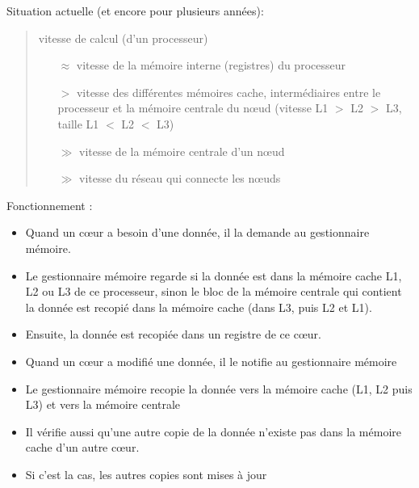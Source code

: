 \documentclass{beamer}
\begin{document}
\begin{frame}[fragile]
Situation actuelle (et encore pour plusieurs ann\'ees): 
\begin{quote}
	
	\vfill
	vitesse de calcul (d'un processeur)
	\vfill
	
	\begin{itemize}
		\item[$\approx$] vitesse de la m\'emoire interne (registres) du processeur
			\medskip
	        
		\item[$>$] vitesse des diff\'erentes m\'emoires cache, interm\'ediaires entre le processeur et la m\'emoire centrale du n\oe ud (vitesse L1 $>$ L2 $>$ L3, taille L1 $<$ L2 $<$ L3)
			\medskip
			
		\item[$\gg$] vitesse de la m\'emoire centrale d'un n\oe ud
			\medskip
			
		\item[$\gg$] vitesse du r\'eseau qui connecte les n\oe uds
	\end{itemize}


\end{quote}

\end{frame}

\begin{frame}
Fonctionnement :

\begin{itemize}
	\item Quand un c\oe ur  a besoin d'une donn\'ee, il la demande au gestionnaire m\'emoire.
	\vfill
	
	\item Le gestionnaire m\'emoire regarde si la donn\'ee est dans la m\'emoire cache L1, L2 ou L3 de ce processeur, sinon le bloc de la m\'emoire centrale qui contient la donn\'ee est recopi\'e dans la m\'emoire cache (dans L3, puis L2 et  L1).
	
	\vfill
	\item Ensuite, la donn\'ee est recopi\'ee dans un registre de ce c\oe ur.
	
	\vfill
\end{itemize}
\end{frame}

\begin{frame}

\vfill
\begin{itemize}
\item Quand un c\oe ur a modifi\'e une donn\'ee, il le notifie au gestionnaire m\'emoire
\vfill
\item Le gestionnaire m\'emoire recopie la donn\'ee vers la m\'emoire cache (L1, L2 puis L3) et vers la m\'emoire centrale
\vfill
\item Il v\'erifie aussi qu'une autre copie de la donn\'ee n'existe pas dans la m\'emoire cache d'un autre c\oe ur.
\vfill
\item Si c'est la cas, les autres copies sont mises \`a jour
\end{itemize}
	\vfill
\end{frame}
\end{document}
